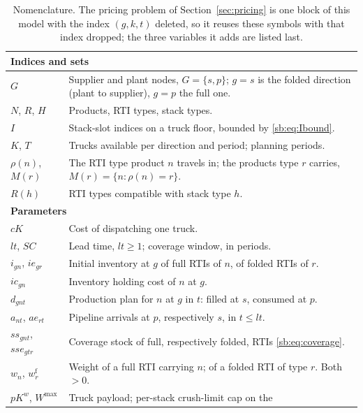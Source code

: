 \begin{longtable}[hbt!]{|p{}|p{}|}
    \caption{Nomenclature. The pricing problem of
    Section~\ref{sec:pricing} is one block of this model with the index
    $(g,k,t)$ deleted, so it reuses these symbols with that index
    dropped; the three variables it adds are listed last.}
    \label{tab:sb-Nomenclature}\\
    \hline
    \multicolumn{2}{|l|}{\textbf{Indices and sets}}\\\hline
    $G$            & Supplier and plant nodes, $G=\{s,p\}$; $g=s$ is the folded
                     direction (plant to supplier), $g=p$ the full one.\\
    $N$, $R$, $H$  & Products, RTI types, stack types.\\
    $I$            & Stack-slot indices on a truck floor, bounded by
                     \eqref{sb:eq:Ibound}.\\
    $K$, $T$       & Trucks available per direction and period; planning periods.\\
    $\rho(n)$, $M(r)$ & The RTI type product $n$ travels in; the products type $r$
                     carries, $M(r)=\{n:\rho(n)=r\}$.\\
    $R(h)$         & RTI types compatible with stack type $h$.\\
    \hline
    \multicolumn{2}{|l|}{\textbf{Parameters}}\\\hline
    $cK$           & Cost of dispatching one truck.\\
    $lt$, $SC$     & Lead time, $lt\ge1$; coverage window, in periods.\\
    $i_{gn}$, $ie_{gr}$ & Initial inventory at $g$ of full RTIs of $n$, of folded RTIs of $r$.\\
    $ic_{gn}$      & Inventory holding cost of $n$ at $g$.\\
    $d_{gnt}$      & Production plan for $n$ at $g$ in $t$: filled at $s$, consumed at $p$.\\
    $a_{nt}$, $ae_{rt}$ & Pipeline arrivals at $p$, respectively $s$, in $t\le lt$.\\
    $ss_{gnt}$, $sse_{gtr}$ & Coverage stock of full, respectively folded, RTIs
                     \eqref{sb:eq:coverage}.\\
    $w_{n}$, $w^{\mathrm{f}}_{r}$ & Weight of a full RTI carrying $n$; of a folded
                     RTI of type $r$. Both $>0$.\\
    $pK^{w}$, $W^{\max}$ & Truck payload; per-stack crush-limit cap on the

\end{longtable}
